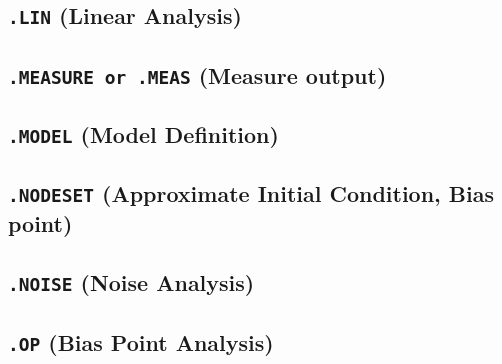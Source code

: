 \newpage
\subsection{\texttt{.LIN} (Linear Analysis)}


\newpage
\subsection{\texttt{.MEASURE or .MEAS} (Measure output)}


\newpage
\subsection{\texttt{.MODEL} (Model Definition)}



\newpage
\subsection{\texttt{.NODESET} (Approximate Initial Condition, Bias point)}


\newpage
\subsection{\texttt{.NOISE} (Noise Analysis) }
 



\newpage
\subsection{\texttt{.OP} (Bias Point Analysis)}


